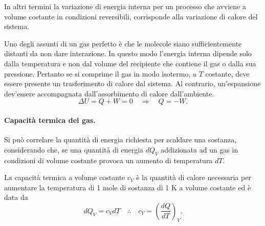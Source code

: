 In altri termini la variazione di energia interna per un processo che avviene a volume costante in condizioni reversibili, corrisponde alla variazione di calore del sistema.
\begin{obs}
    Uno degli assunti di un gas perfetto è che le molecole siano
    sufficientemente distanti da non dare interazione. In questo modo l'energia interna dipende solo dalla temperatura e non dal volume del recipiente che contiene il gas o dalla sua pressione. Pertanto se si comprime il gas in modo isotermo, a $T$ costante, deve essere presente un trasferimento di calore dal sistema. Al contrario, un'espansione dev'essere accompagnata dall'assorbimento di calore dall'ambiente.
    \begin{equation}
        \Delta U=Q+W=0\quad\Rightarrow\quad Q=-W.
    \end{equation}
\end{obs}
\paragraph{Capacità termica dei gas.} Si può correlare la quantità di energia richiesta per scaldare una sostanza, considerando che, se una
quantità di energia $dQ_V$ addizionata ad un gas in condizioni di volume costante provoca un aumento di
temperatura $dT$.
\begin{defn}
    La capacità termica a volume costante $c_V$ è la quantità di calore necessaria per aumentare la temperatura di 1 mole di sostanza di 1 K a volume costante ed è data da
    \begin{equation}\label{eq:cap.term.V.cost}
        dQ_V=c_VdT\quad\therefore\quad c_V=\left(\frac{dQ}{dT}\right)_V.
    \end{equation}
\end{defn}
